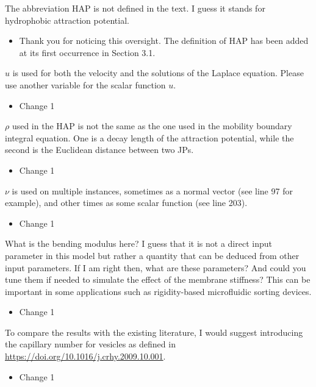 \documentclass[11pt]{article}
\newcommand{\comment}[1]{{\color{blue} #1}}
\begin{document}
\noindent
\comment{The abbreviation HAP is not defined in the text. I guess it stands for hydrophobic attraction potential.
}
\begin{itemize}
  \item Thank you for noticing this oversight. The definition of HAP has
    been added at its first occurrence in Section 3.1. 
\end{itemize}

\noindent
\comment{$u$ is used for both the velocity and the solutions of the
Laplace equation. Please use another variable for the scalar function
$u$.}
\begin{itemize}
  \item Change 1 
\end{itemize}

\noindent
\comment{$\rho$ used in the HAP is not the same as the one used in the
mobility boundary integral equation. One is a decay length of the
attraction potential, while the second is the Euclidean distance between
two JPs.}
\begin{itemize}
  \item Change 1 
\end{itemize}

\noindent
\comment{$\nu$ is used on multiple instances, sometimes as a normal
vector (see line 97 for example), and other times as some scalar
function (see line 203).}
\begin{itemize}
  \item Change 1 
\end{itemize}

\noindent
\comment{What is the bending modulus here? I guess that it is not a
direct input parameter in this model but rather a quantity that can be
deduced from other input parameters. If I am right then, what are these
parameters? And could you tune them if needed to simulate the effect of
the membrane stiffness? This can be important in some applications such
as rigidity-based microfluidic sorting devices.}
\begin{itemize}
  \item Change 1 
\end{itemize}

\noindent
\comment{To compare the results with the existing literature, I would
suggest introducing the capillary number for vesicles as defined in
\url{https://doi.org/10.1016/j.crhy.2009.10.001}.}
\begin{itemize}
  \item Change 1 
\end{itemize}
\end{document}
